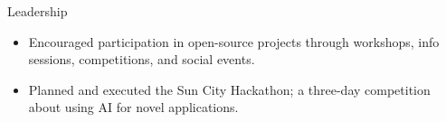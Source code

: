 \documentclass{resume} %
\begin{document}
\begin{workSection}{Leadership}
    
    \customItem[
    	title=President \& Founder - Free and Open-Source Software Club at UTEP,
    	duration=Spring 2024 - Present
    ]
    \begin{itemize}
    	\vspace{-0.5em}
    	\itemsep -6pt {}
    	\item Encouraged participation in open-source projects through workshops, info sessions, competitions, and social events.
    \end{itemize}

    \customItem[
        title=Treasurer - Association for Computing Machinery at UTEP,
        duration=Fall 2022 - Present
    ]
    \begin{itemize}
        \vspace{-0.5em}
        \itemsep -6pt {}
        \item Planned and executed the Sun City Hackathon; a three-day competition about using AI for novel applications.
    \end{itemize}
\end{workSection}

\end{document}
